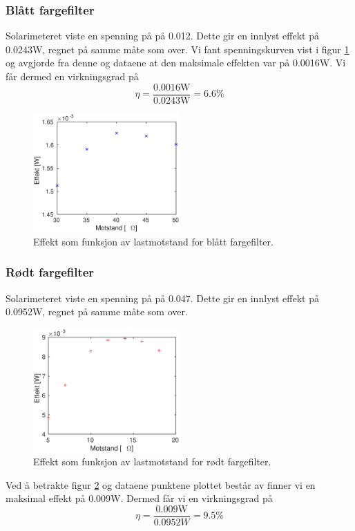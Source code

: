\documentclass[a4paper,11pt, twocolumn]{article}
\begin{document}
\subsubsection{Blått fargefilter}
Solarimeteret viste en spenning på på 0.012. Dette gir en innlyst effekt på 0.0243W, regnet på samme måte som over. Vi fant spenningskurven vist i figur \ref{fig:effektBlue} og avgjorde fra denne og dataene at den maksimale effekten var på 0.0016W. Vi får dermed en virkningsgrad på 
\begin{equation}
	\eta = \frac{0.0016\text{W}}{0.0243\text{W}} = 6.6\text{\%}
\end{equation}
\begin{figure}[!ht]
	\includegraphics[width = 0.5\textwidth]{matlab/LAB/effektBlue.eps}
	\caption{Effekt som funksjon av lastmotstand for blått fargefilter.}
	\label{fig:effektBlue}
\end{figure}
\subsubsection{Rødt fargefilter}
Solarimeteret viste en spenning på på 0.047. Dette gir en innlyst effekt på 0.0952W, regnet på samme måte som over.
\begin{figure}[!ht]
	\includegraphics[width = 0.5\textwidth]{matlab/LAB/effektRed.eps}
	\caption{Effekt som funksjon av lastmotstand for rødt fargefilter.}
	\label{fig:effektRed}
\end{figure}
Ved å betrakte figur \ref{fig:effektRed} og dataene punktene plottet består av finner vi en maksimal effekt på 0.009W. Dermed får vi en virkningsgrad på 
\begin{equation}
	\eta = \frac{0.009\text{W}}{0.0952W} = 9.5\text{\%}
\end{equation}
\end{document}
